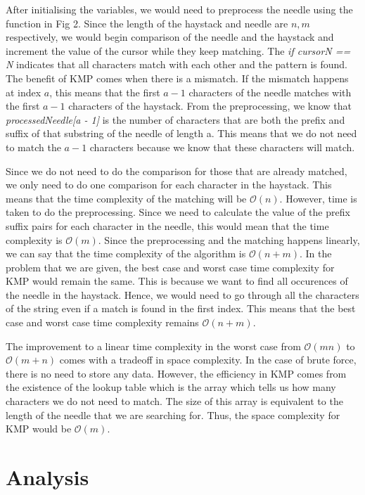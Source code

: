 After initialising the variables, we would need to preprocess the needle using the function in Fig 2. Since the length of the haystack and needle are $n, m$ respectively, we would begin comparison of the needle and the haystack and increment the value of the cursor while they keep matching. The \emph{if cursorN == N} indicates that all characters match with each other and the pattern is found. The benefit of KMP comes when there is a mismatch. If the mismatch happens at index $a$, this means that the first $a - 1$ characters of the needle matches with the first $a - 1$ characters of the haystack. From the preprocessing, we know that \emph{processedNeedle[a - 1]} is the number of characters that are both the prefix and suffix of that substring of the needle of length a. This means that we do not need to match the $a - 1$ characters because we know that these characters will match.

Since we do not need to do the comparison for those that are already matched, we only need to do one comparison for each character in the haystack. This means that the time complexity of the matching will be $\mathcal{O}(n)$. However, time is taken to do the preprocessing. Since we need to calculate the value of the prefix suffix pairs for each character in the needle, this would mean that the time complexity is $\mathcal{O}(m)$. Since the preprocessing and the matching happens linearly, we can say that the time complexity of the algorithm is $\mathcal{O}(n+m)$. In the problem that we are given, the best case and worst case time complexity for KMP would remain the same. This is because we want to find all occurences of the needle in the haystack. Hence, we would need to go through all the characters of the string even if a match is found in the first index. This means that the best case and worst case time complexity remains $\mathcal{O}(n+m)$.

The improvement to a linear time complexity in the worst case from $\mathcal{O}(mn)$ to $\mathcal{O}(m + n)$ comes with a tradeoff in space complexity. In the case of brute force, there is no need to store any data. However, the efficiency in KMP comes from the existence of the lookup table which is the array which tells us how many characters we do not need to match. The size of this array is equivalent to the length of the needle that we are searching for. Thus, the space complexity for KMP would be $\mathcal{O}(m)$.

\section*{Analysis}
